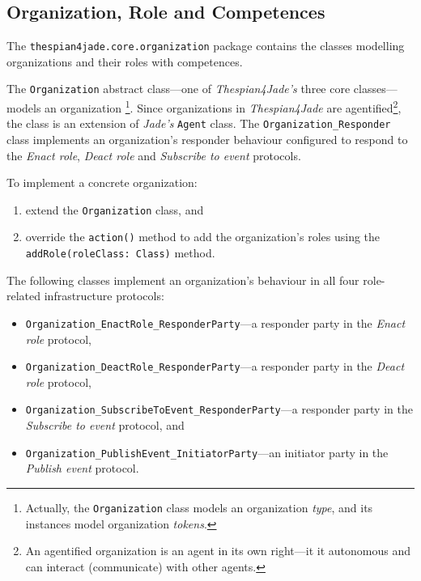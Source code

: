 \subsection{Organization, Role and Competences}

The \texttt{thespian4jade.core.organization} package contains the classes modelling organizations and their roles with competences.

The \texttt{Organization} abstract class---one of \textit{Thespian4Jade's} three core classes---models an organization
\footnote{Actually, the \texttt{Organization} class models an organization \textit{type}, and its instances model organization \textit{tokens}.}.
Since organizations in \textit{Thespian4Jade} are agentified\footnote{An agentified organization is an agent in its own right---it it autonomous and can interact (communicate) with other agents.}, the class is an extension of \textit{Jade's} \texttt{Agent} class.
The \texttt{Organization\_Responder} class implements an organization's responder behaviour configured to respond to the \textit{Enact role}, \textit{Deact role} and \textit{Subscribe to event} protocols.

To implement a concrete organization:
\begin{enumerate}
	\item extend the \texttt{Organization} class, and
	\item override the \texttt{action()} method to add the organization's roles using the \texttt{addRole(roleClass: Class)} method.	
\end{enumerate}

The following classes implement an organization's behaviour in all four role-related infrastructure protocols:
\begin{itemize}
	\item \texttt{Organization\_EnactRole\_ResponderParty}---a responder party in the \textit{Enact role} protocol,
	\item \texttt{Organization\_DeactRole\_ResponderParty}---a responder party in the \textit{Deact role} protocol,
	\item \texttt{Organization\_SubscribeToEvent\_ResponderParty}---a responder party in the \textit{Subscribe to event} protocol, and
	\item \texttt{Organization\_PublishEvent\_InitiatorParty}---an initiator party in the \textit{Publish event} protocol.
\end{itemize}


